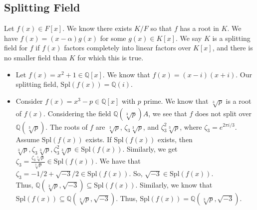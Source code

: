 \documentclass[10pt]{extarticle}
\newcommand{\Q}{\mathbb{Q}}
\begin{document}
  \subsection{Splitting Field}%
  Let $f(x)\in F[x]$. We know there exists $K/F$ so that $f$ has a root in $K$. We have $f(x) = (x-\alpha)g(x)$ for some $g(x)\in K[x]$. We say $K$ is a splitting field for $f$ if $f(x)$ factors completely into linear factors over $K[x]$, and there is no smaller field than $K$ for which this is true.
  \begin{itemize}
    \item Let $f(x) = x^2 + 1\in \Q[x]$. We know that $f(x) = (x-i)(x+i)$. Our splitting field, $\text{Spl}(f(x)) = \Q(i)$.
    \item Consider $f(x) = x^3 - p\in \Q[x]$ with $p$ prime. We know that $\sqrt[3]{p}$ is a root of $f(x)$. Considering the field $\Q(\sqrt[3]{p})A$, we see that $f$ does not split over $\Q(\sqrt[3]{p})$. The roots of $f$ are $\sqrt[3]{p}$, $\zeta_3\sqrt[3]{p}$, and $\zeta_3^2\sqrt[3]{p}$, where $\zeta_3 = e^{2\pi i/3}$.\\

      Assume $\text{Spl}(f(x))$ exists. If $\text{Spl}(f(x))$ exists, then $\sqrt[3]{p},\zeta_3\sqrt[3]{p},\zeta_3^2\sqrt[3]{p}\in \text{Spl}(f(x))$. Similarly, we get $\zeta_3 = \frac{\zeta_3\sqrt[3]{p}}{\sqrt[3]{p}}\in \text{Spl}(f(x))$. We have that $\zeta_3 = -1/2 + \sqrt{-3}/2\in \text{Spl}(f(x))$. So, $\sqrt{-3}\in \text{Spl}(f(x))$.\\

      Thus, $\Q(\sqrt[3]{p},\sqrt{-3})\subseteq \text{Spl}(f(x))$. Similarly, we know that $\text{Spl}(f(x))\subseteq \Q(\sqrt[3]{p},\sqrt{-3})$. Thus, $\text{Spl}(f(x)) = \Q(\sqrt[3]{p},\sqrt{-3})$.
      \begin{center}
      \end{center}
  \end{itemize}
\end{document}
